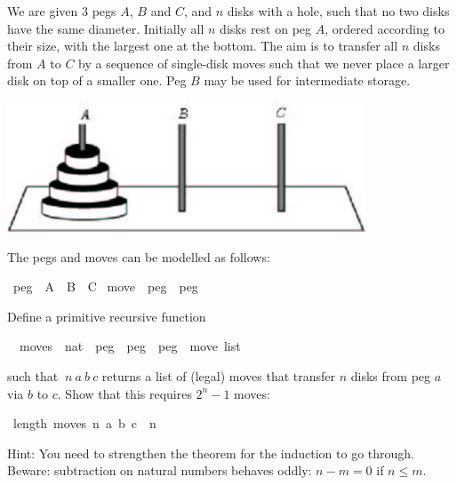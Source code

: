 %
\begin{isabellebody}%
\def\isabellecontext{Hanoi}%
\isamarkupfalse%
%
\isamarkuptrue%
%
\begin{isamarkuptext}%
We are given 3 pegs $A$, $B$ and $C$, and $n$ disks with a hole, such
that no two disks have the same diameter.  Initially all $n$ disks
rest on peg $A$, ordered according to their size, with the largest one
at the bottom. The aim is to transfer all $n$ disks from $A$ to $C$ by
a sequence of single-disk moves such that we never place a larger disk
on top of a smaller one. Peg $B$ may be used for intermediate storage.

\begin{center}
\includegraphics[width=0.8\textwidth]{Hanoi}
\end{center}

\medskip The pegs and moves can be modelled as follows:%
\end{isamarkuptext}%
\isamarkuptrue%
\ peg\ {\isacharequal}\ A\ {\isacharbar}\ B\ {\isacharbar}\ C\isanewline
\isamarkupfalse%
\ move\ {\isacharequal}\ {\isachardoublequote}peg\ {\isacharasterisk}\ peg{\isachardoublequote}\isamarkupfalse%
%
\begin{isamarkuptext}%
Define a primitive recursive function%
\end{isamarkuptext}%
\isamarkuptrue%
\isanewline
\ \ moves\ {\isacharcolon}{\isacharcolon}\ {\isachardoublequote}nat\ {\isacharequal}{\isachargreater}\ peg\ {\isacharequal}{\isachargreater}\ peg\ {\isacharequal}{\isachargreater}\ peg\ {\isacharequal}{\isachargreater}\ move\ list{\isachardoublequote}\isamarkupfalse%
%
\begin{isamarkuptext}%
such that $~n~a~b~c$ returns a list of (legal)
moves that transfer $n$ disks from peg $a$ via $b$ to $c$.
Show that this requires $2^n - 1$ moves:%
\end{isamarkuptext}%
\isamarkuptrue%
\ {\isachardoublequote}length\ {\isacharparenleft}moves\ n\ a\ b\ c{\isacharparenright}\ {\isacharequal}\ {}{\isacharcircum}n\ {\isacharminus}\ {}{\isachardoublequote}\isamarkupfalse%
\isamarkupfalse%
%
\begin{isamarkuptext}%
Hint: You need to strengthen the theorem for the
induction to go through. Beware: subtraction on natural numbers
behaves oddly: $n - m = 0$ if $n \le m$.%
\end{isamarkuptext}%
\isamarkuptrue%
\isamarkupfalse%
\end{isabellebody}%
